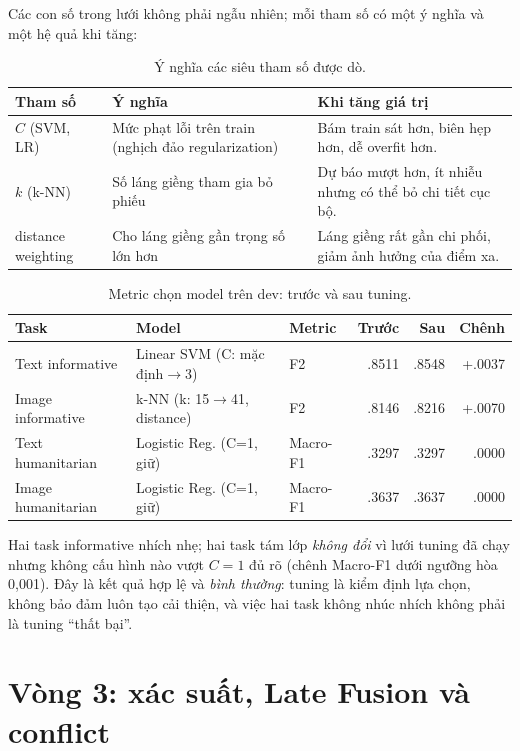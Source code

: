 Các con số trong lưới không phải ngẫu nhiên; mỗi tham số có một ý nghĩa và một
hệ quả khi tăng:

\begin{table}[H]\centering\small
\caption{Ý nghĩa các siêu tham số được dò.}
\begin{tabularx}{\textwidth}{p{2.2cm}p{4.4cm}X}
\toprule
\textbf{Tham số} & \textbf{Ý nghĩa} & \textbf{Khi tăng giá trị}\\
\midrule
\(C\) (SVM, LR) & Mức phạt lỗi trên train (nghịch đảo regularization) &
Bám train sát hơn, biên hẹp hơn, dễ overfit hơn.\\
\(k\) (k-NN) & Số láng giềng tham gia bỏ phiếu &
Dự báo mượt hơn, ít nhiễu nhưng có thể bỏ chi tiết cục bộ.\\
distance weighting & Cho láng giềng gần trọng số lớn hơn &
Láng giềng rất gần chi phối, giảm ảnh hưởng của điểm xa.\\
\bottomrule
\end{tabularx}
\end{table}

\begin{table}[H]\centering\small
\caption{Metric chọn model trên dev: trước và sau tuning.}
\begin{tabular}{lllrrr}
\toprule
\textbf{Task} & \textbf{Model} & \textbf{Metric} & \textbf{Trước} &
\textbf{Sau} & \textbf{Chênh}\\
\midrule
Text informative & Linear SVM (C: mặc định$\to$3) & F2 & .8511 & .8548 & +.0037\\
Image informative & k-NN (k: 15$\to$41, distance) & F2 & .8146 & .8216 & +.0070\\
Text humanitarian & Logistic Reg. (C=1, giữ) & Macro-F1 & .3297 & .3297 & .0000\\
Image humanitarian & Logistic Reg. (C=1, giữ) & Macro-F1 & .3637 & .3637 & .0000\\
\bottomrule
\end{tabular}
\end{table}

Hai task informative nhích nhẹ; hai task tám lớp \emph{không đổi} vì lưới tuning
đã chạy nhưng không cấu hình nào vượt \(C=1\) đủ rõ (chênh Macro-F1 dưới ngưỡng
hòa 0,001). Đây là kết quả hợp lệ và \emph{bình thường}: tuning là kiểm định lựa
chọn, không bảo đảm luôn tạo cải thiện, và việc hai task không nhúc nhích không
phải là tuning ``thất bại''.

\section{Vòng 3: xác suất, Late Fusion và conflict}

